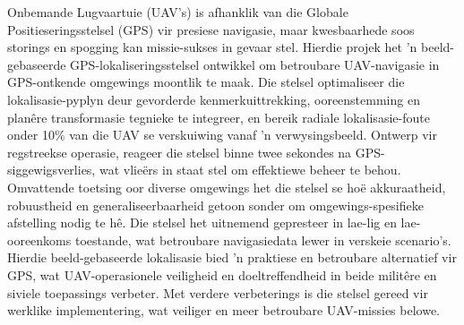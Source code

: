 Onbemande Lugvaartuie (UAV's) is afhanklik van die Globale Positieseringsstelsel (GPS) vir presiese navigasie, maar kwesbaarhede soos storings en spogging kan missie-sukses in gevaar stel. Hierdie projek het 'n beeld-gebaseerde GPS-lokaliseringsstelsel ontwikkel om betroubare UAV-navigasie in GPS-ontkende omgewings moontlik te maak. Die stelsel optimaliseer die lokalisasie-pyplyn deur gevorderde kenmerkuittrekking, ooreenstemming en planêre transformasie tegnieke te integreer, en bereik radiale lokalisasie-foute onder 10\% van die UAV se verskuiwing vanaf 'n verwysingsbeeld. Ontwerp vir regstreekse operasie, reageer die stelsel binne twee sekondes na GPS-siggewigsverlies, wat vlieërs in staat stel om effektiewe beheer te behou. Omvattende toetsing oor diverse omgewings het die stelsel se hoë akkuraatheid, robuustheid en generaliseerbaarheid getoon sonder om omgewings-spesifieke afstelling nodig te hê. Die stelsel het uitnemend gepresteer in lae-lig en lae-ooreenkoms toestande, wat betroubare navigasiedata lewer in verskeie scenario's. Hierdie beeld-gebaseerde lokalisasie bied 'n praktiese en betroubare alternatief vir GPS, wat UAV-operasionele veiligheid en doeltreffendheid in beide militêre en siviele toepassings verbeter. Met verdere verbeterings is die stelsel gereed vir werklike implementering, wat veiliger en meer betroubare UAV-missies belowe.





